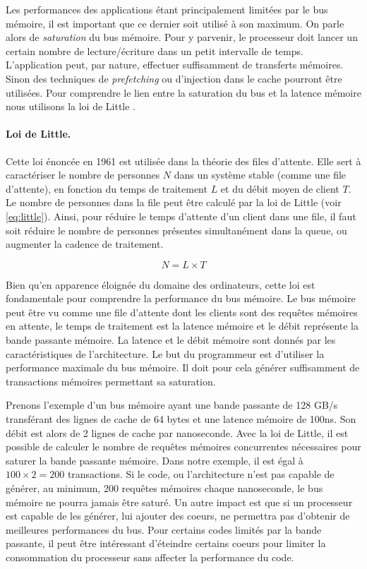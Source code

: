 Les performances des applications étant principalement limitées par le bus mémoire, il est important que ce dernier soit utilisé à son maximum. On parle alors de \textit{saturation} du bus mémoire. Pour y parvenir, le processeur doit lancer un certain nombre de lecture/écriture dans un petit intervalle de temps. L'application peut, par nature, effectuer suffisamment de transferts mémoires. Sinon des techniques de \textit{prefetching} ou d'injection dans le cache pourront être utilisées. Pour comprendre le lien entre la saturation du bus et la latence mémoire nous utilisons la loi de Little \cite{Little_1961}.

\paragraph{Loi de Little.}\label{sec:loidelittle} Cette loi énoncée en 1961 est utilisée dans la théorie des files d'attente. Elle sert à caractériser le nombre de personnes $N$ dans un système stable (comme une file d'attente), en fonction du temps de traitement $L$ et du débit moyen de client $T$. Le nombre de personnes dans la file peut être calculé par la loi de Little (voir \autoref{eq:little}). Ainsi, pour réduire le temps d'attente d'un client dans une file, il faut soit réduire le nombre de personnes présentes simultanément dans la queue, ou augmenter la cadence de traitement.

\begin{equation} \label{eq:little}
    N = L \times T
\end{equation}

Bien qu'en apparence éloignée du domaine des ordinateurs, cette loi est fondamentale pour comprendre la performance du bus mémoire. Le bus mémoire peut être vu comme une file d'attente dont les clients sont des requêtes mémoires en attente, le temps de traitement est la latence mémoire et le débit représente la bande passante mémoire. La latence et le débit mémoire sont donnés par les caractéristiques de l'architecture. Le but du programmeur est d'utiliser la performance maximale du bus mémoire. Il doit pour cela générer suffisamment de transactions mémoires permettant sa saturation.

Prenons l'exemple d'un bus mémoire ayant une bande passante de 128 GB/s transférant des lignes de cache de 64 bytes et une latence mémoire de 100ns. Son débit est alors de 2 lignes de cache par nanoseconde. Avec la loi de Little, il est possible de calculer le nombre de requêtes mémoires concurrentes nécessaires pour saturer la bande passante mémoire. Dans notre exemple, il est égal à $100 \times 2 = 200$ transactions. 
Si le code, ou l’architecture n’est pas capable de générer, au minimum, 200 requêtes mémoires chaque nanoseconde, le bus mémoire ne pourra jamais être saturé. Un autre impact est que si un processeur est capable de les générer, lui ajouter des coeurs, ne permettra pas d’obtenir de meilleures performances du bus. Pour certains codes limités par la bande passante, il peut être intéressant d’éteindre certains coeurs pour limiter la consommation du processeur sans affecter la performance du code.


